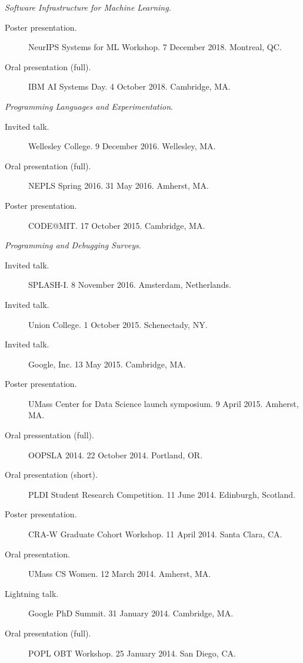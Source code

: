 \documentclass[10pt]{article}
\newcommand{\cvsec}[2]{
    \begin{tcolorbox}[width=\textwidth, breakable, title={#1}]
        #2
    \end{tcolorbox}
    \vspace{10pt}
}
\begin{document}
\cvsec{Talks and Presentations}{
  \emph{Software Infrastructure for Machine Learning}.
  \begin{description}
    \item[Poster presentation.] NeurIPS Systems for ML Workshop. 7 December 2018. Montreal, QC.
    \item[Oral presentation (full).] IBM AI Systems Day. 4 October 2018. Cambridge, MA.
  \end{description}
     \vspace{10pt}
    \emph{Programming Languages and Experimentation}.
    \begin{description}
      \item[Invited talk.] Wellesley College. 9 December 2016. Wellesley, MA.
      \item[Oral presentation (full).] NEPLS Spring 2016. 31 May 2016. Amherst, MA.
      \item[Poster presentation.] CODE@MIT. 17 October 2015. Cambridge, MA.
    \end{description}
    \vspace{10pt}
    \emph{Programming and Debugging Surveys}.
    \begin{description}
      \item[Invited talk.] SPLASH-I. 8 November 2016. Amsterdam, Netherlands.
      \item[Invited talk.] Union College. 1 October 2015. Schenectady, NY.
      \item[Invited talk.] Google, Inc. 13 May 2015. Cambridge, MA.
      \item[Poster presentation.] UMass Center for Data Science launch symposium. 9 April 2015. Amherst, MA.
      \item[Oral pressentation (full).] OOPSLA 2014. 22 October 2014. Portland, OR.
      \item[Oral presentation (short).] PLDI Student Research Competition. 11 June 2014. Edinburgh, Scotland.
      \item[Poster presentation.] CRA-W Graduate Cohort Workshop. 11 April 2014. Santa Clara, CA.
      \item[Oral presentation.] UMass CS Women. 12 March 2014. Amherst, MA.
      \item[Lightning talk.] Google PhD Summit. 31 January 2014. Cambridge, MA.
      \item[Oral presentation (full).]  POPL OBT Workshop. 25 January 2014. San Diego, CA.
    \end{description}
    \vspace{10pt}
}
\end{document}
